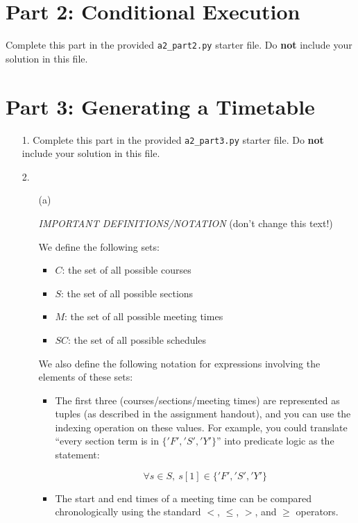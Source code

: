 \documentclass[fontsize=11pt]{article}
\begin{document}
\section*{Part 2: Conditional Execution}

Complete this part in the provided \texttt{a2\_part2.py} starter file.
Do \textbf{not} include your solution in this file.

\newpage

\section*{Part 3: Generating a Timetable}

\begin{enumerate}

\item[1.]
Complete this part in the provided \texttt{a2\_part3.py} starter file.
Do \textbf{not} include your solution in this file.

\item[2.]

\begin{enumerate}
\item[(a)]

\emph{IMPORTANT DEFINITIONS/NOTATION} (don't change this text!)

We define the following sets:

\begin{itemize}
\item $C$: the set of all possible courses
\item $S$: the set of all possible sections
\item $M$: the set of all possible meeting times
\item $SC$: the set of all possible schedules
\end{itemize}

We also define the following notation for expressions involving the elements of these sets:

\begin{itemize}
\item
The first three (courses/sections/meeting times) are represented as tuples (as described in the assignment handout), and you can use the indexing operation on these values. For example, you could translate ``every section term is in $\{'F', 'S', 'Y'\}$'' into predicate logic as the statement:

    \[\forall s \in S,~ s[1] \in \{'F', 'S', 'Y' \} \]

\item
The start and end times of a meeting time can be compared chronologically using the standard $<$, $\leq$, $>$, and $\geq$ operators.


\end{itemize}
\end{enumerate}
\end{enumerate}
\end{document}
